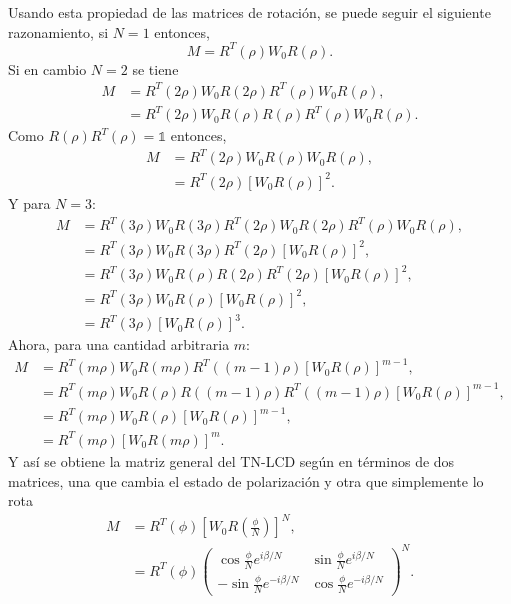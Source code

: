 Usando esta propiedad de las matrices de rotación, se puede seguir el
siguiente razonamiento, si $N=1$ entonces,
\begin{equation*}
  M = R^T(\rho)W_0R(\rho).
\end{equation*}
Si en cambio $N=2$ se tiene
\begin{align*}
  M &= R^T(2\rho)W_0R(2\rho)R^T(\rho)W_0R(\rho),\\
      &=R^T(2\rho)W_0R(\rho)R(\rho)R^T(\rho)W_0R(\rho).
\end{align*}
Como $R(\rho)R^T(\rho)=\mathds{1}$ entonces,
\begin{align*}
 M &= R^T(2\rho)W_0R(\rho)W_0R(\rho),\\
     &=R^T(2\rho)\left[W_0R(\rho)\right]^2.
\end{align*}
Y para $N=3$:
\begin{align*}
  M &= R^T(3\rho)W_0R(3\rho)R^T(2\rho)W_0R(2\rho)R^T(\rho)W_0R(\rho),\\
      &=R^T(3\rho)W_0R(3\rho)R^T(2\rho)\left[W_0R(\rho)\right]^2,\\
      &=R^T(3\rho)W_0R(\rho)R(2\rho)R^T(2\rho)\left[W_0R(\rho)\right]^2,\\
      &=R^T(3\rho)W_0R(\rho)\left[W_0R(\rho)\right]^2,\\
      &=R^T(3\rho)\left[W_0R(\rho)\right]^3.
\end{align*}
Ahora, para una cantidad arbitraria $m$:
\begin{align*}
  M &= R^T(m\rho)W_0R(m\rho)R^T((m-1)\rho)\left[W_0R(\rho)\right]^{m-1},\\
      &=R^T(m\rho)W_0R(\rho)R((m-1)\rho)R^T((m-1)\rho)\left[W_0R(\rho)\right]^{m-1},\\  
      &=R^T(m\rho)W_0R(\rho)\left[W_0R(\rho)\right]^{m-1},\\
      &=R^T(m\rho)\left[W_0R(m\rho)\right]^{m}.
\end{align*}
Y así se obtiene la matriz general del TN-LCD según  en
términos de dos matrices, una que cambia el estado de polarización y
otra que simplemente lo rota
\begin{align}
M&=R^T\left( \phi\right)
\left[W_0R\left(\frac{\phi}{N}\right)\right]^N,\\
&=R^T\left( \phi\right)
\begin{pmatrix}
  \cos{\frac{\phi}{N}e^{i\beta/N}} &  \sin{\frac{\phi}{N}e^{i\beta/N}}\\
  -\sin{\frac{\phi}{N}e^{-i\beta/N}} &  \cos{\frac{\phi}{N}e^{-i\beta/N}}  
\end{pmatrix}^N.
\label{eq:general_lcd_matrix}
\end{align}
